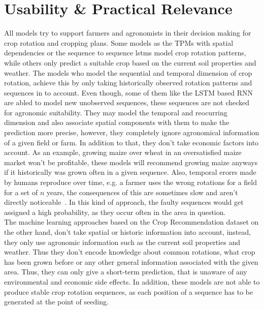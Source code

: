 \documentclass{Academic}
\begin{document}
    \section{Usability \& Practical Relevance}
    All models try to support farmers and agronomists in their decision making for crop rotation and cropping plans. Some models as the TPMs with spatial dependencies or the sequence to sequence lstms model crop rotation patterns, while others only predict a suitable crop based on the current soil properties and weather. The models who model the sequential and temporal dimension of crop rotation, achieve this by only taking historically observed rotation patterns and sequences in to account. Even though, some of them like the LSTM based RNN are abled to model new unobserved sequences, these sequences are not checked for agronomic suitability. They may model the temporal and reocurring dimension and also associate spatial components with them to make the prediction more precise, however, they completely ignore agronomical information of a given field or farm. In addition to that, they don't take economic factors into account. As an example, growing maize over wheat in an oversatisfied maize market won't be profitable, these models will recommend growing maize anyways if it historically was grown often in a given sequence. Also, temporal erorrs made by humans reproduce over time, e.g. a farmer uses the wrong rotations for a field for a set of $n$ years, the consequences of this are sometimes slow and aren't directly noticeable~\cite{upcott_new_2023}. In this kind of approach, the faulty sequences would get assigned a high probability, as they occur often in the area in question.\\
    The machine learning approaches based on the Crop Recommendation dataset on the other hand, don't take spatial or historic information into account, instead, they only use agronomic information such as the current soil properties and weather. Thus they don't encode knowledge about common rotations, what crop has been grown before or any other general information associated with the given area. Thus, they can only give a short-term prediction, that is unaware of any environmental and economic side effects. In addition, these models are not able to produce stable crop rotation sequences, as each position of a sequence has to be generated at the point of seeding.\\
\end{document}
